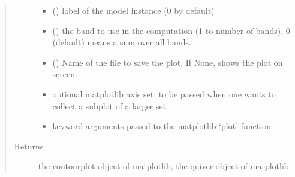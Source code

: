 \documentclass[letterpaper,10pt,english]{sphinxmanual}
\begin{document}
\begin{fulllineitems}
\begin{quote}
\begin{description}
\begin{itemize}
\item {} 
\sphinxAtStartPar
{} () \textendash{} label of the model instance (0 by default)

\item {} 
\sphinxAtStartPar
{} () \textendash{} the band to use in the computation (1 to number of bands). 0 (default) means a sum over all bands.

\item {} 
\sphinxAtStartPar
{} () \textendash{} Name of the file to save the plot. If None, shows the plot on screen.

\item {} 
\sphinxAtStartPar
{} \textendash{} optional matplotlib axis set, to be passed when one wants to collect a subplot of a larger set

\item {} 
\sphinxAtStartPar
{} \textendash{} keyword arguments passed to the matplotlib ‘plot’ function

\end{itemize}

\item[{Returns}] \leavevmode
\sphinxAtStartPar
the contourplot object of matplotlib, the quiver object of matplotlib

\end{description}\end{quote}

\end{fulllineitems}

\end{document}
